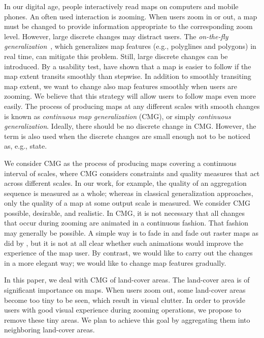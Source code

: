 \documentclass[acmsmall,natbib=false]{acmart}
\begin{document}
In our digital age, people interactively read maps 
on computers and mobile phones.
An often used interaction is zooming. 
When users zoom in or out, 
a map must be changed to provide information 
appropriate to the corresponding zoom level.
However, large discrete changes may distract users.
The \emph{on-the-fly generalization}~\parencite{Weibel2017Fly},
which generalizes map features (e.g., polyglines and polygons) 
in real time, can mitigate this problem.
Still, large discrete changes can be introduced.
By a usability test, \textcite{Midtbo2007} have shown that 
a map is easier to follow 
if the map extent transits smoothly than stepwise. 
In addition to smoothly transiting map extent, 
we want to change also map features smoothly 
when users are zooming.
We believe that this strategy will allow users 
to follow maps even more easily.
The process of producing maps at any different scales
with smooth changes 
is known as \emph{continuous map generalization} (CMG), 
or simply \emph{continuous generalization}.
Ideally, there should be no discrete change in CMG.
However, the term is also used when 
the discrete changes are small enough not to be noticed as,
e.g., \textcite{Suba2016Road} state.

We consider CMG as the process of producing maps 
covering a continuous interval of scales,
where CMG considers constraints and quality measures 
that act across different scales. 
In our work, for example, the quality of an aggregation sequence 
is measured as a whole; 
whereas in classical generalization approaches, 
only the quality of a map at some output scale is measured.
We consider CMG possible, desirable, and realistic.
In CMG, it is not necessary that 
all changes that occur during zooming are animated in a continuous fashion. 
That fashion may generally be possible. 
A simple way is to fade in and fade out raster maps
as did by \textcite{Pantazis2009b}, 
but it is not at all clear 
whether such animations would improve the experience of the map user.
By contrast, we would like to carry out the changes in a more elegant way;
we would like to change map features gradually.




In this paper, we deal with CMG of land-cover areas.
The land-cover area is of significant importance on maps.
When users zoom out, some land-cover areas become
too tiny to be seen, which result in visual clutter.
In order to provide users 
with good visual experience during zooming operations,
we propose to remove these tiny areas.
We plan to achieve this goal by 
aggregating them into neighboring land-cover areas.
\end{document}

